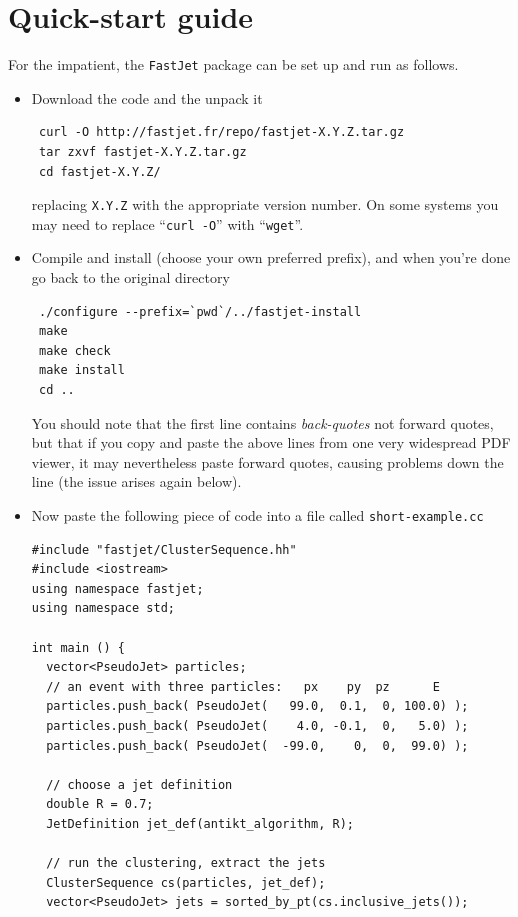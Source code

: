\documentclass[12pt,a4]{article}
\newcommand{\fastjet}{\texttt{FastJet}\xspace}
\newcommand{\ttt}[1]{{\small\texttt{#1}}}
\begin{document}
\section{Quick-start guide}
\label{sec:quick-start}

For the impatient, the \fastjet package can be set up and run as follows.

\begin{itemize}
\item Download the code and the unpack it
\begin{verbatim}
 curl -O http://fastjet.fr/repo/fastjet-X.Y.Z.tar.gz 
 tar zxvf fastjet-X.Y.Z.tar.gz
 cd fastjet-X.Y.Z/
\end{verbatim}
replacing \ttt{X.Y.Z} with the appropriate version number. On some
systems you may need to replace ``\texttt{curl -O}'' with
``\texttt{wget}''. 

\item Compile and install (choose your own preferred prefix), and when 
you're done go back to the original directory
\begin{verbatim}
 ./configure --prefix=`pwd`/../fastjet-install
 make
 make check
 make install
 cd ..
\end{verbatim}
You should note that the first line contains \emph{back-quotes}
not forward quotes, but that if you copy and paste the above lines from 
one very widespread PDF viewer, it may nevertheless paste
forward quotes, causing problems down the line (the issue arises again
below). 

\item
Now paste the following piece of code into a file called \tt{short-example.cc}
\begin{lstlisting}
#include "fastjet/ClusterSequence.hh"
#include <iostream>
using namespace fastjet;
using namespace std;

int main () {
  vector<PseudoJet> particles;
  // an event with three particles:   px    py  pz      E
  particles.push_back( PseudoJet(   99.0,  0.1,  0, 100.0) ); 
  particles.push_back( PseudoJet(    4.0, -0.1,  0,   5.0) ); 
  particles.push_back( PseudoJet(  -99.0,    0,  0,  99.0) );

  // choose a jet definition
  double R = 0.7;
  JetDefinition jet_def(antikt_algorithm, R);

  // run the clustering, extract the jets
  ClusterSequence cs(particles, jet_def);
  vector<PseudoJet> jets = sorted_by_pt(cs.inclusive_jets());


\end{lstlisting}
\end{itemize}
\end{document}
